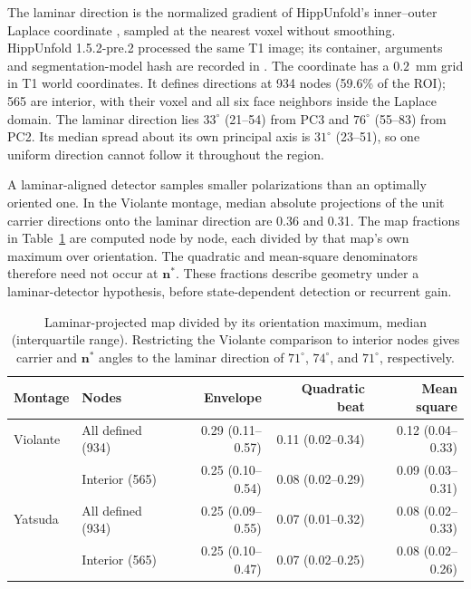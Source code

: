 \documentclass[11pt,a4paper]{article}
\providecommand{\DIFaddtex}[1]{{\protect\color{blue} \sf #1}} %
\providecommand{\DIFadd}[1]{\texorpdfstring{\DIFaddtex{#1}}{#1}} %
\begin{document}
\DIFadd{The laminar direction is the normalized gradient of HippUnfold's inner--outer
Laplace coordinate \cite{dekraker2022}, sampled at the nearest voxel without
smoothing. HippUnfold 1.5.2-pre.2 processed the same T1 image; its container,
arguments and segmentation-model hash are recorded in
}\DIFadd{. The coordinate has a $0.2$~mm grid
in T1 world coordinates. It defines directions at 934 nodes (59.6\% of the
ROI); 565 are interior, with their voxel and all six face neighbors inside
the Laplace domain. The laminar direction lies $33^\circ$ (21--54) from PC3
and $76^\circ$ (55--83) from PC2. Its median spread about its own principal
axis is $31^\circ$ (23--51), so one uniform direction cannot follow it
throughout the region.
}

\DIFadd{A laminar-aligned detector samples smaller polarizations than an optimally
oriented one. In the Violante montage, median absolute projections of the
unit carrier directions onto the laminar direction are 0.36 and 0.31.
The map fractions in Table~\ref{tab:fem-laminar-fractions} are computed
node by node, each divided by that map's own maximum over orientation.
The quadratic and mean-square denominators therefore need not occur at
$\mathbf n^*$. These fractions describe geometry under a laminar-detector
hypothesis, before state-dependent detection or recurrent gain.
}

\begin{table}[htbp]
\color{blue}
\centering\small
\begin{tabular}{@{}llrrr@{}}
\toprule
Montage & Nodes & Envelope & Quadratic beat & Mean square\\
\midrule
Violante & All defined (934) & 0.29 (0.11--0.57) & 0.11 (0.02--0.34) & 0.12 (0.04--0.33)\\
 & Interior (565) & 0.25 (0.10--0.54) & 0.08 (0.02--0.29) & 0.09 (0.03--0.31)\\
Yatsuda & All defined (934) & 0.25 (0.09--0.55) & 0.07 (0.01--0.32) & 0.08 (0.02--0.33)\\
 & Interior (565) & 0.25 (0.10--0.47) & 0.07 (0.02--0.25) & 0.08 (0.02--0.26)\\
\bottomrule
\end{tabular}
\caption{\color{blue}Laminar-projected map divided by its orientation maximum, median
(interquartile range). Restricting the Violante comparison to interior nodes
gives carrier and $\mathbf n^*$ angles to the laminar direction of
$71^\circ$, $74^\circ$, and $71^\circ$, respectively.}
\label{tab:fem-laminar-fractions}
\end{table}
\end{document}
